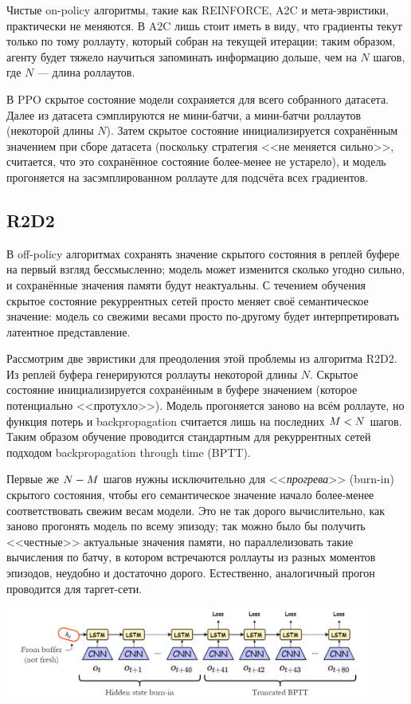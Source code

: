 Чистые on-policy алгоритмы, такие как REINFORCE, A2C и мета-эвристики, практически не меняются. В A2C лишь стоит иметь в виду, что градиенты текут только по тому роллауту, который собран на текущей итерации; таким образом, агенту будет тяжело научиться запоминать информацию дольше, чем на $N$ шагов, где $N$ --- длина роллаутов.

В PPO скрытое состояние модели сохраняется для всего собранного датасета. Далее из датасета сэмплируются не мини-батчи, а мини-батчи роллаутов (некоторой длины $N$). Затем скрытое состояние инициализируется сохранённым значением при сборе датасета (поскольку стратегия <<не меняется сильно>>, считается, что это сохранённое состояние более-менее не устарело), и модель прогоняется на засэмплированном роллауте для подсчёта всех градиентов.

\subsection{R2D2}

В off-policy алгоритмах сохранять значение скрытого состояния в реплей буфере на первый взгляд бессмысленно; модель может изменится сколько угодно сильно, и сохранённые значения памяти будут неактуальны. С течением обучения скрытое состояние рекуррентных сетей просто меняет своё семантическое значение: модель со свежими весами просто по-другому будет интерпретировать латентное представление.

Рассмотрим две эвристики для преодоления этой проблемы из алгоритма R2D2. Из реплей буфера генерируются роллауты некоторой длины $N$. Скрытое состояние инициализируется сохранённым в буфере значением (которое потенциально <<протухло>>). Модель прогоняется заново на всём роллауте, но функция потерь и backpropagation считается лишь на последних $M \HM< N$ шагов. Таким образом обучение проводится стандартным для рекуррентных сетей подходом backpropagation through time (BPTT).

Первые же $N \HM- M$ шагов нужны исключительно для <<\emph{прогрева}>> (burn-in) скрытого состояния, чтобы его семантическое значение начало более-менее соответствовать свежим весам модели. Это не так дорого вычислительно, как заново прогонять модель по всему эпизоду; так можно было бы получить <<честные>> актуальные значения памяти, но параллелизовать такие вычисления по батчу, в котором встречаются роллауты из разных моментов эпизодов, неудобно и достаточно дорого. Естественно, аналогичный прогон проводится для таргет-сети.

\begin{center}
    \includegraphics[width=0.9\textwidth]{Images/R2D2.png}
\end{center}

